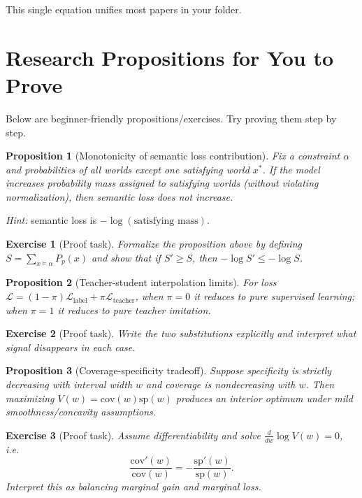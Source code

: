 ﻿\documentclass[11pt,a4paper]{article}
\newtheorem{proposition}{Proposition}
\newtheorem{exercise}{Exercise}
\begin{document}
This single equation unifies most papers in your folder.

\section{Research Propositions for You to Prove}
Below are beginner-friendly propositions/exercises. Try proving them step by step.

\begin{proposition}[Monotonicity of semantic loss contribution]
Fix a constraint $\alpha$ and probabilities of all worlds except one satisfying world $x^*$. If the model increases probability mass assigned to satisfying worlds (without violating normalization), then semantic loss does not increase.
\end{proposition}
\textit{Hint:} semantic loss is $-\log(\text{satisfying mass})$.

\begin{exercise}[Proof task]
Formalize the proposition above by defining $S=\sum_{x\models\alpha}P_p(x)$ and show that if $S'\ge S$, then $-\log S'\le -\log S$.
\end{exercise}

\begin{proposition}[Teacher-student interpolation limits]
For loss
\(\mathcal L=(1-\pi)\mathcal L_{\text{label}}+\pi\mathcal L_{\text{teacher}}\),
when $\pi=0$ it reduces to pure supervised learning; when $\pi=1$ it reduces to pure teacher imitation.
\end{proposition}

\begin{exercise}[Proof task]
Write the two substitutions explicitly and interpret what signal disappears in each case.
\end{exercise}

\begin{proposition}[Coverage-specificity tradeoff]
Suppose specificity is strictly decreasing with interval width $w$ and coverage is nondecreasing with $w$. Then maximizing
\(V(w)=\mathrm{cov}(w)\mathrm{sp}(w)\)
produces an interior optimum under mild smoothness/concavity assumptions.
\end{proposition}

\begin{exercise}[Proof task]
Assume differentiability and solve $\frac{d}{dw}\log V(w)=0$, i.e.
\[
\frac{\mathrm{cov}'(w)}{\mathrm{cov}(w)} = -\frac{\mathrm{sp}'(w)}{\mathrm{sp}(w)}.
\]
Interpret this as balancing marginal gain and marginal loss.
\end{exercise}
\end{document}
